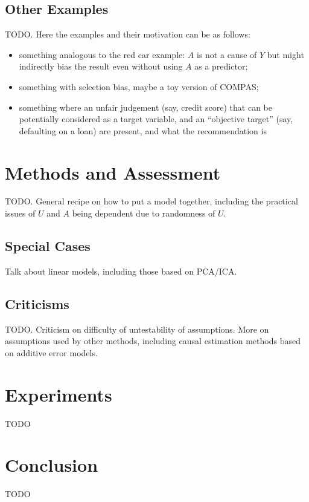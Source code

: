 \documentclass{article}
\begin{document}
\subsection{Other Examples}

TODO. Here the examples and their motivation can be as follows:

\begin{itemize}
\item something analogous to the red car example: $A$ is not a cause of
  $Y$ but might indirectly bias the result even without using $A$ as a predictor;
\item something with selection bias, maybe a toy version of COMPAS;
\item something where an unfair judgement (say, credit score) that can be potentially
  considered as a target variable, and an
  ``objective target'' (say, defaulting on a loan) are present, and
  what the recommendation is
\end{itemize}

\section{Methods and Assessment}
\label{sec:methods}

TODO. General recipe on how to put a model together, including the practical
issues of $U$ and $A$ being dependent due to randomness of $U$.

\subsection{Special Cases}

Talk about linear models, including those based on PCA/ICA.

\subsection{Criticisms}

TODO. Criticism on difficulty of untestability of assumptions.
More on assumptions used by other methods, including causal
estimation methods based on additive error models.

\section{Experiments}

TODO

\section{Conclusion}

TODO



\end{document}
